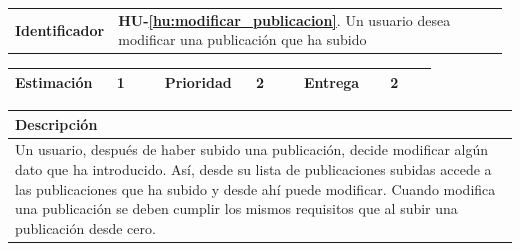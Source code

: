 \documentclass[11pt]{article}
\begin{document}
\begin{longtable}{p{0.18\linewidth}|p{0.8\linewidth}}
  \rowcolor{LightCyan}
  \textbf{Identificador} & \textbf{{HU-\ref{hu:modificar_publicacion}}}. Un usuario desea modificar una publicación que ha subido \\  
\end{longtable}
\vspace{-0.8cm}
\begin{longtable}{p{0.18\linewidth}|p{0.1\linewidth}|p{0.18\linewidth}|p{0.1\linewidth}|p{0.18\linewidth}|p{0.1\linewidth}}
  \toprule
  \textbf{Estimación} & 1 & \textbf{Prioridad} & 2& \textbf{Entrega} & 2 \\
  \bottomrule
\end{longtable}
\vspace{-0.8cm}
\begin{longtable}{p{1.028\linewidth}}
  \textbf{Descripción}\\
  \midrule
  Un usuario, después de haber subido una publicación, decide modificar algún dato que ha introducido. Así, desde su lista de publicaciones subidas accede a las publicaciones que ha subido y desde ahí puede modificar. Cuando modifica una publicación se deben cumplir los mismos requisitos que al subir una publicación desde cero. \\
  \bottomrule
\end{longtable}
\vspace{-0.8cm}
\end{document}
